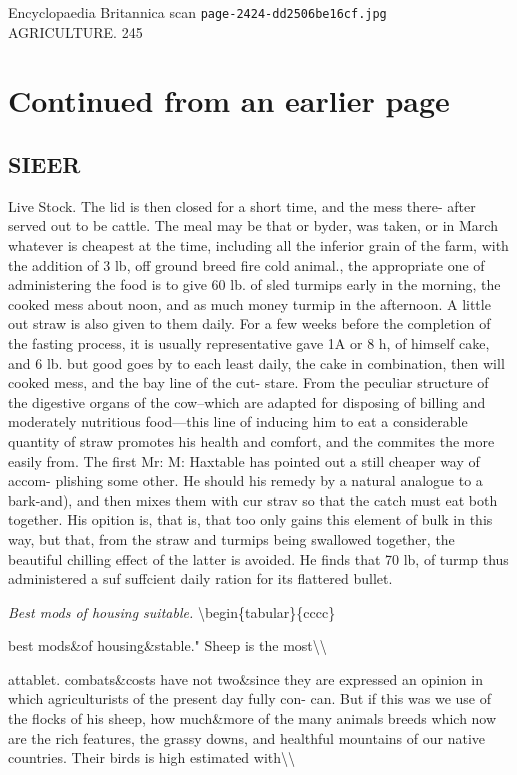 \documentclass{article}
\begin{document}
\begin{center}
{\Large Encyclopaedia Britannica scan \texttt{page-2424-dd2506be16cf.jpg}}\\[0.5em]
AGRICULTURE. 245
\end{center}
\section*{Continued from an earlier page}
\subsection*{SIEER}
Live Stock. The lid is then closed for a short time, and the mess there- after served out to be cattle. The meal may be that or byder, was taken, or in March whatever is cheapest at the time, including all the inferior grain of the farm, with the addition of 3 lb, off ground breed fire cold animal., the appropriate one of administering the food is to give 60 lb. of sled turmips early in the morning, the cooked mess about noon, and as much money turmip in the afternoon. A little out straw is also given to them daily. For a few weeks before the completion of the fasting process, it is usually representative gave 1A or 8 h, of himself cake, and 6 lb. but good goes by to each least daily, the cake in combination, then will cooked mess, and the bay line of the cut- stare. From the peculiar structure of the digestive organs of the cow--which are adapted for disposing of billing and moderately nutritious food—this line of inducing him to eat a considerable quantity of straw promotes his health and comfort, and the commites the more easily from. The first Mr: M: Haxtable has pointed out a still cheaper way of accom- plishing some other. He should his remedy by a natural analogue to a bark-and), and then mixes them with cur strav so that the catch must eat both together. His opition is, that is, that too only gains this element of bulk in this way, but that, from the straw and turmips being swallowed together, the beautiful chilling effect of the latter is avoided. He finds that 70 lb, of turmp thus administered a suf suffcient daily ration for its flattered bullet.

\textit{Best mods of housing suitable.}
\textbackslash{}begin\{tabular\}\{cccc\}

best mods\&of housing\&stable." Sheep is the most\textbackslash{}\textbackslash{}

attablet. combats\&costs have not two\&since they are expressed an opinion in which agriculturists of the present day fully con- can. But if this was we use of the flocks of his sheep, how much\&more of the many animals breeds which now are the rich features, the grassy downs, and healthful mountains of our native countries. Their birds is high estimated with\textbackslash{}\textbackslash{}
\end{document}
